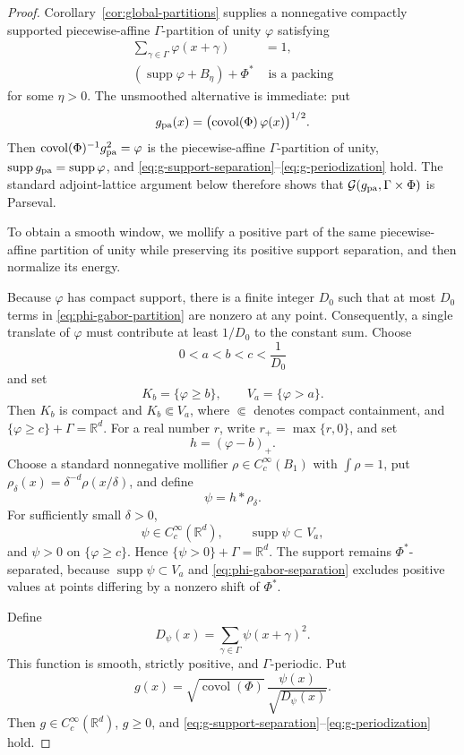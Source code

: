\documentclass[11pt,reqno]{amsart}
\numberwithin{equation}{section}
\theoremstyle{definition}
\theoremstyle{remark}
\newcommand{\R}{\mathbb R}
\newcommand{\covol}{\operatorname{covol}}
\newcommand{\supp}{\operatorname{supp}}
\newcommand{\G}{\mathcal G}
\begin{document}
\begin{proof}
Corollary~\ref{cor:global-partitions} supplies a nonnegative compactly
supported piecewise-affine $\Gamma$-partition of unity $\varphi$ satisfying
\begin{align}
 \sum_{\gamma\in\Gamma}\varphi(x+\gamma)&=1,
 \label{eq:phi-gabor-partition}\\
 (\supp\varphi+B_\eta)+\Phi^*&\text{ is a packing}
 \label{eq:phi-gabor-separation}
\end{align}
for some $\eta>0$.  The unsmoothed alternative is immediate: put
\begin{equation}\label{eq:g-pa-from-phi}
 g_{\rm pa}(x)=\bigl(\covol(\Phi)\,\varphi(x)\bigr)^{1/2}.
\end{equation}
Then $\covol(\Phi)^{-1}g_{\rm pa}^2=\varphi$ is the
piecewise-affine $\Gamma$-partition of unity,
$\supp g_{\rm pa}=\supp\varphi$, and
\eqref{eq:g-support-separation}--\eqref{eq:g-periodization} hold.  The
standard adjoint-lattice argument below therefore shows that
$\G(g_{\rm pa},\Gamma\times\Phi)$ is Parseval.

To obtain a smooth window, we mollify a positive part of the same
piecewise-affine partition of unity while
preserving its positive support separation, and then normalize its energy.

Because $\varphi$ has compact support, there is a finite integer $D_0$ such
that at most $D_0$ terms in \eqref{eq:phi-gabor-partition} are nonzero at
any point.  Consequently, a single translate of $\varphi$ must contribute at least $1/D_0$ to the constant sum. Choose
\[
                         0<a<b<c<\frac1{D_0}
\]
and set
\[
 K_b=\{\varphi\ge b\},
 \qquad
 V_a=\{\varphi>a\}.
\]
Then $K_b$ is compact and $K_b\Subset V_a$, where $\Subset$ denotes compact
containment, and $\{\varphi\ge c\}+\Gamma=\R^d$.  For a real number $r$,
write $r_+=\max\{r,0\}$, and set
\[
                         h=(\varphi-b)_+.
\]
Choose a standard nonnegative mollifier $\rho\in C_c^\infty(B_1)$ with
$\int\rho=1$, put $\rho_\delta(x)=\delta^{-d}\rho(x/\delta)$, and define
\[
                         \psi=h*\rho_\delta.
\]
For sufficiently small $\delta>0$,
\[
 \psi\in C_c^\infty(\R^d),
 \qquad
 \supp\psi\subset V_a,
\]
and $\psi>0$ on $\{\varphi\ge c\}$.  Hence
$\{\psi>0\}+\Gamma=\R^d$.  The support remains $\Phi^*$-separated, because
$\supp\psi\subset V_a$ and \eqref{eq:phi-gabor-separation} excludes positive
values at points differing by a nonzero shift of $\Phi^*$.

Define
\[
 D_\psi(x)=\sum_{\gamma\in\Gamma}\psi(x+\gamma)^2.
\]
This function is smooth, strictly positive, and $\Gamma$-periodic.  Put
\[
                         g(x)=\sqrt{\covol(\Phi)}\,
                         \frac{\psi(x)}{\sqrt{D_\psi(x)}}.
\]
Then $g\in C_c^\infty(\R^d)$, $g\ge0$, and
\eqref{eq:g-support-separation}--\eqref{eq:g-periodization} hold.


\end{proof}
\end{document}
